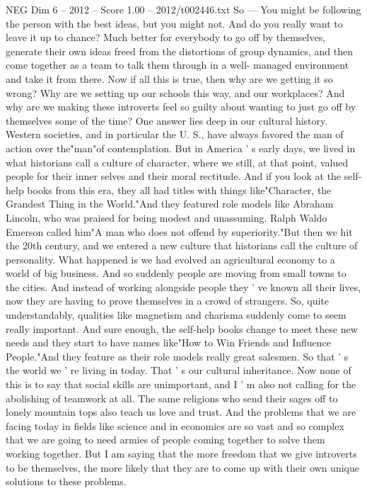 \begin{textsample}{NEG Dim 6 – 2012 – Score 1.00 – 2012/t002446.txt}
So — You might be following the person with the best ideas, but you might not.
And do you really want to leave it up to chance?
Much better for everybody to go off by themselves, generate their own ideas freed from the distortions of group dynamics, and then come together as a team to talk them through in a well- managed environment and take it from there.
Now if all this is true, then why are we getting it so wrong?
Why are we setting up our schools this way, and our workplaces?
And why are we making these introverts feel so guilty about wanting to just go off by themselves some of the time?
One answer lies deep in our cultural history.
Western societies, and in particular the U.
S., have always favored the man of action over the"man"of contemplation.
But in America ' s early days, we lived in what historians call a culture of character, where we still, at that point, valued people for their inner selves and their moral rectitude.
And if you look at the self-help books from this era, they all had titles with things like"Character, the Grandest Thing in the World."And they featured role models like Abraham Lincoln, who was praised for being modest and unassuming.
Ralph Waldo Emerson called him"A man who does not offend by superiority."But then we hit the 20th century, and we entered a new culture that historians call the culture of personality.
What happened is we had evolved an agricultural economy to a world of big business.
And so suddenly people are moving from small towns to the cities.
And instead of working alongside people they ' ve known all their lives, now they are having to prove themselves in a crowd of strangers.
So, quite understandably, qualities like magnetism and charisma suddenly come to seem really important.
And sure enough, the self-help books change to meet these new needs and they start to have names like"How to Win Friends and Influence People."And they feature as their role models really great salesmen.
So that ' s the world we ' re living in today.
That ' s our cultural inheritance.
Now none of this is to say that social skills are unimportant, and I ' m also not calling for the abolishing of teamwork at all.
The same religions who send their sages off to lonely mountain tops also teach us love and trust.
And the problems that we are facing today in fields like science and in economics are so vast and so complex that we are going to need armies of people coming together to solve them working together.
But I am saying that the more freedom that we give introverts to be themselves, the more likely that they are to come up with their own unique solutions to these problems.

\end{textsample}
